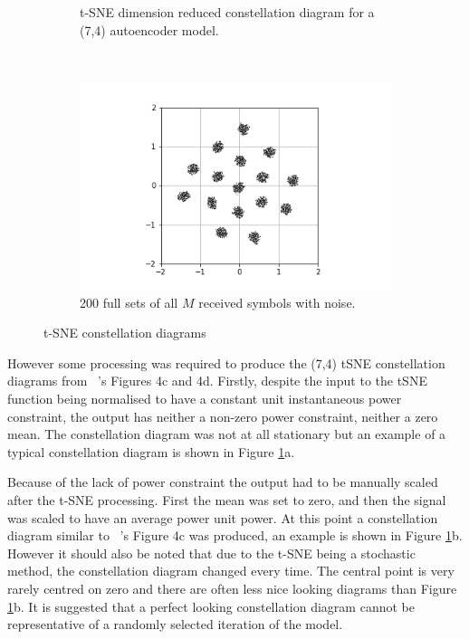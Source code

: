 \documentclass[12pt,onecolumn,letterpaper]{article}
\begin{document}
\begin{figure}[t!]
\begin{subfigure}[t]{0.3\textwidth}
       \caption{t-SNE dimension reduced constellation diagram for a (7,4) autoencoder model.}
   \end{subfigure}
   ~
   \begin{subfigure}[t]{0.3\textwidth}
       \centering
       \includegraphics[width=\linewidth]{figures/tSNE_7_4_constellation_diagram_with_noise_200.png}
       \caption{200 full sets of all $M$ received symbols with noise.}
   \end{subfigure}
   \caption{t-SNE constellation diagrams}
   \label{fig:tSneConstellationDiags}
\end{figure}

However some processing was required to produce the (7,4) tSNE constellation diagrams from ~\cite{oShea}'s Figures 4c and 4d. Firstly, despite the input to the tSNE function being normalised to have a constant unit instantaneous power constraint, the output has neither a non-zero power constraint, neither a zero mean. The constellation diagram was not at all stationary but an example of a typical constellation diagram is shown in Figure \ref{fig:tSneConstellationDiags}a.

Because of the lack of power constraint the output had to be manually scaled after the t-SNE processing. First the mean was set to zero, and then the signal was scaled to have an average power unit power. At this point a constellation diagram similar to ~\cite{oShea}'s Figure 4c was produced, an example is shown in Figure \ref{fig:tSneConstellationDiags}b. However it should also be noted that due to the t-SNE being a stochastic method, the constellation diagram changed every time. The central point is very rarely centred on zero and there are often less nice looking diagrams than Figure \ref{fig:tSneConstellationDiags}b. It is suggested that a perfect looking constellation diagram cannot be representative of a randomly selected iteration of the model.
\end{document}
